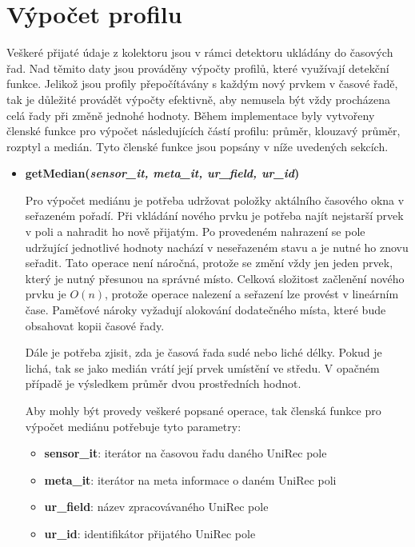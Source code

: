\section{Výpočet profilu}   
Veškeré přijaté údaje z kolektoru jsou v rámci detektoru ukládány do časových řad. Nad těmito 
daty jsou prováděny výpočty profilů, které využívají detekční funkce. Jelikož jsou profily
přepočítávány s každým nový prvkem v časové řadě, tak je důležité provádět výpočty efektivně, 
aby nemusela být vždy procházena celá řady při změně jednohé hodnoty. Během implementace byly
vytvořeny členské funkce pro výpočet následujících částí profilu: průměr, klouzavý průměr, rozptyl a
medián. Tyto členské funkce jsou popsány v níže uvedených sekcích.

\begin{itemize}
 \item \textbf{getMedian(\textit{sensor\_it, meta\_it, ur\_field, ur\_id})}
 
 Pro výpočet mediánu je potřeba udržovat položky aktálního časového okna v seřazeném pořadí.
 Při vkládání nového prvku je potřeba najít nejstarší prvek v poli a nahradit ho nově přijatým. 
 Po provedeném nahrazení se pole udržující jednotlivé hodnoty nachází v neseřazeném stavu a je nutné
 ho znovu seřadit. Tato operace není náročná, protože se změní vždy jen jeden prvek, který je nutný
 přesunou na správné místo. Celková složitost začlenění nového prvku je $O(n)$, protože operace 
 nalezení a seřazení lze provést v lineárním čase. Paměťové nároky vyžadují alokování dodatečného
 místa, které bude obsahovat kopii časové řady.
 
 Dále je potřeba zjisit, zda je časová řada sudé nebo liché délky. Pokud je lichá, tak se jako 
 medián vrátí její prvek umístění ve středu. V opačném případě je výsledkem průměr dvou prostředních
 hodnot.
 
 Aby mohly být provedy veškeré popsané operace, tak členská funkce pro výpočet mediánu
 potřebuje tyto parametry:
 \begin{itemize}
   \item \textbf{sensor\_it}: iterátor na časovou řadu daného UniRec pole
   \item \textbf{meta\_it}: iterátor na meta informace o daném UniRec poli
   \item \textbf{ur\_field}: název zpracovávaného UniRec pole
   \item \textbf{ur\_id}: identifikátor přijatého UniRec pole
 \end{itemize}
 

\end{itemize}
